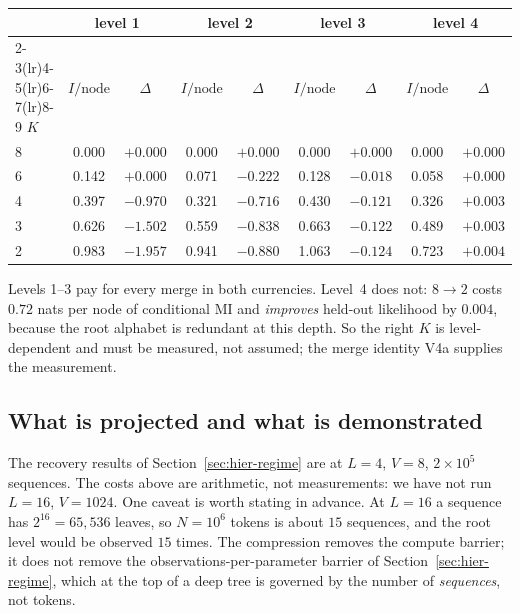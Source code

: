 \documentclass[11pt,a4paper]{article}
\theoremstyle{plain}
\theoremstyle{definition}
\begin{document}
\begin{center}
\begin{tabular}{lcccccccc}
\toprule
 & \multicolumn{2}{c}{level 1} & \multicolumn{2}{c}{level 2}
 & \multicolumn{2}{c}{level 3} & \multicolumn{2}{c}{level 4} \\
\cmidrule(lr){2-3}\cmidrule(lr){4-5}\cmidrule(lr){6-7}\cmidrule(lr){8-9}
$K$ & $I/\text{node}$ & $\Delta$ & $I/\text{node}$ & $\Delta$
    & $I/\text{node}$ & $\Delta$ & $I/\text{node}$ & $\Delta$ \\
\midrule
8 & 0.000 & $+0.000$ & 0.000 & $+0.000$ & 0.000 & $+0.000$ & 0.000 & $+0.000$ \\
6 & 0.142 & $+0.000$ & 0.071 & $-0.222$ & 0.128 & $-0.018$ & 0.058 & $+0.000$ \\
4 & 0.397 & $-0.970$ & 0.321 & $-0.716$ & 0.430 & $-0.121$ & 0.326 & $+0.003$ \\
3 & 0.626 & $-1.502$ & 0.559 & $-0.838$ & 0.663 & $-0.122$ & 0.489 & $+0.003$ \\
2 & 0.983 & $-1.957$ & 0.941 & $-0.880$ & 1.063 & $-0.124$ & 0.723 & $+0.004$ \\
\bottomrule
\end{tabular}
\end{center}

\noindent
Levels 1--3 pay for every merge in both currencies. Level~4 does not: $8\to2$
costs $0.72$ nats per node of conditional MI and \emph{improves} held-out
likelihood by $0.004$, because the root alphabet is redundant at this depth.
So the right $K$ is level-dependent and must be measured, not assumed; the
merge identity V4a supplies the measurement.

\subsection{What is projected and what is demonstrated}

The recovery results of Section~\ref{sec:hier-regime} are at $L=4$, $V=8$,
$2\times10^5$ sequences. The costs above are arithmetic, not measurements: we
have not run $L=16$, $V=1024$. One caveat is worth stating in advance. At
$L=16$ a sequence has $2^{16}=65{,}536$ leaves, so $N=10^6$ tokens is about
$15$ sequences, and the root level would be observed $15$ times. The
compression removes the compute barrier; it does not remove the
observations-per-parameter barrier of Section~\ref{sec:hier-regime}, which at
the top of a deep tree is governed by the number of \emph{sequences}, not
tokens.
\end{document}
